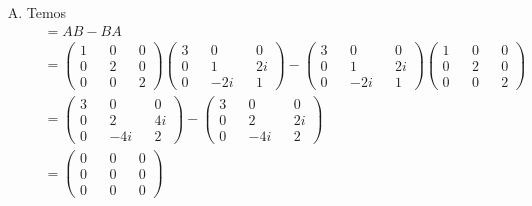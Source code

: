 \documentclass[a4paper, 12pt, notitlepage]{article}
\begin{document}
\begin{enumerate}
\begin{enumerate}[(A)]
  \item
  Temos
  \begin{align*}
    [A, B] &= AB - BA \\
    &= \begin{pmatrix}
    1 && 0 && 0 \\
    0 && 2 && 0 \\
    0 && 0 && 2
    \end{pmatrix}
    \begin{pmatrix}
    3 && 0 && 0 \\
    0 && 1 && 2i \\
    0 && -2i && 1
    \end{pmatrix} - 
    \begin{pmatrix}
    3 && 0 && 0 \\
    0 && 1 && 2i \\
    0 && -2i && 1
    \end{pmatrix}
    \begin{pmatrix}
    1 && 0 && 0 \\
    0 && 2 && 0 \\
    0 && 0 && 2
    \end{pmatrix}\\
    &= \begin{pmatrix}
    3 && 0 && 0 \\
    0 && 2 && 4i \\
    0 && -4i && 2
    \end{pmatrix}
    - \begin{pmatrix}
    3 && 0 && 0 \\
    0 && 2 && 2i \\
    0 && -4i && 2
    \end{pmatrix}\\
    &= \begin{pmatrix}
    0 && 0 && 0 \\
    0 && 0 && 0 \\
    0 && 0 && 0
    \end{pmatrix}
  \end{align*}
  

\end{enumerate}
\end{enumerate}
\end{document}
